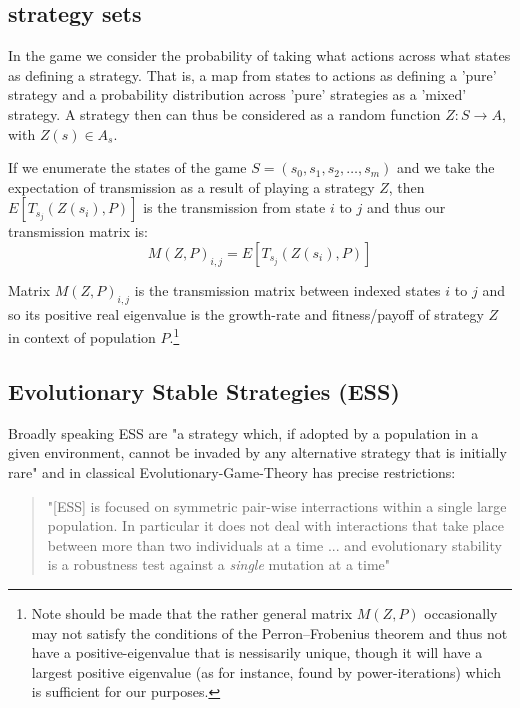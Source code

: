 \documentclass[journal,article,accept,oneauthors,pdftex,10pt,a4paper]{mdpi}
\begin{document}
\subsection{strategy sets}

In the game we consider the probability of taking what actions across what states as defining a strategy.
That is, a map from states to actions as defining a 'pure' strategy and a probability distribution across 'pure' strategies as a 'mixed' strategy.
A strategy then can thus be considered as a random function $Z: S \rightarrow A$, with $Z(s)\in A_s$.

If we enumerate the states of the game $S=(s_0,s_1,s_2,\dots,s_m)$ and we take the expectation of transmission as a result of playing a strategy $Z$, then $E[T_{s_j}(Z(s_i),P)]$ is the transmission from state $i$ to $j$ and thus our transmission matrix is:
$$M(Z,P)_{i,j}=E[T_{s_j}(Z(s_i),P)]$$

Matrix $M(Z,P)_{i,j}$ is the transmission matrix between indexed states $i$ to $j$ and so its positive real eigenvalue is the growth-rate and fitness/payoff of strategy $Z$ in context of population $P$.\footnote{Note should be made that the rather general matrix $M(Z,P)$ occasionally may not satisfy the conditions of the Perron–Frobenius theorem and thus not have a positive-eigenvalue that is nessisarily unique, though it will have a largest positive eigenvalue (as for instance, found by power-iterations) which is sufficient for our purposes.}

\subsection{Evolutionary Stable Strategies (ESS)}

Broadly speaking ESS are "a strategy which, if adopted by a population in a given environment, cannot be invaded by any alternative strategy that is initially rare"\cite{gloss1} and in classical Evolutionary-Game-Theory has precise restrictions:

\begin{quote}"[ESS] is focused on symmetric pair-wise interractions within a single large population. In particular it does not deal with interactions that take place between more than two individuals at a time ... and evolutionary stability is a robustness test against a \textit{single} mutation at a time"\cite{weibull}\end{quote}
\end{document}
